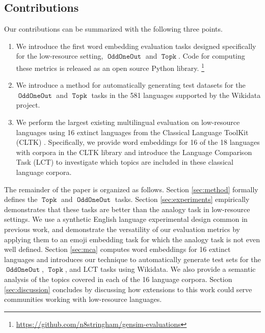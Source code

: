 \documentclass[11pt,a4paper]{article}
\DeclareMathOperator{\OddOneOut}{\texttt{OddOneOut}}
\DeclareMathOperator{\topk}{\texttt{Topk}}
\begin{document}
\subsection{Contributions}
Our contributions can be summarized with the following three points.

\label{sec:contributions}
\begin{enumerate}
    \item 
    We introduce the first word embedding evaluation tasks designed specifically for the low-resource setting, $\OddOneOut$ and $\topk$.
    Code for computing these metrics is released as an open source Python library.%
    \footnote{
        \url{https://github.com/n8stringham/gensim-evaluations}
    }
    \item 
    We introduce a method for automatically generating test datasets for the $\OddOneOut$ and $\topk$ tasks in the 581 languages supported by the Wikidata project.
	\item 
    We perform the largest existing multilingual evaluation on low-resource languages using 16 extinct languages from the Classical Language ToolKit (CLTK) \citep{johnson2014}.
    Specifically, we provide word embeddings for 16 of the 18 languages with corpora in the CLTK library \citep{johnson2014} and introduce the Language Comparison Task (LCT) to investigate which topics are included in these classical language corpora.
\end{enumerate}

The remainder of the paper is organized as follows.
Section \ref{sec:method} formally defines the $\topk$ and $\OddOneOut$ tasks.
Section \ref{sec:experiments} empirically demonstrates that these tasks are better than the analogy task in low-resource settings.
We use a synthetic English language experimental design common in previous work,
and demonstrate the versatility of our evaluation metrics by applying them to an emoji embedding task for which the analogy task is not even well defined.
Section \ref{sec:mca} computes word embeddings for 16 extinct languages and introduces our technique to automatically generate test sets for the $\OddOneOut$, $\topk$, and LCT tasks using Wikidata. We also provide a semantic analysis of the topics covered in each of the 16 language corpora.
Section \ref{sec:discussion} concludes by discussing how extensions to this work could serve communities working with low-resource languages.
\end{document}

